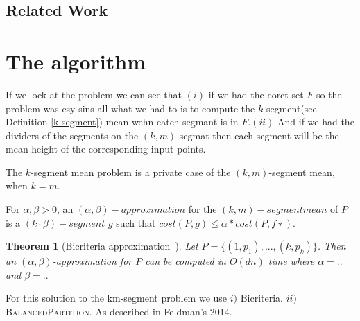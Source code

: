 \documentclass{vldb}
\begin{document}
\subsection{Related Work}

\section{The algorithm}
If we lock at the problem we can see that $(i)$ if we had the corct set $F$
so the problem was esy sins all what we had to is to compute the $k$-segment(see Definition \ref{k-segment}) mean wehn eatch segmant is in $F$.$(ii)$ And if we had the dividers of the segments on the $(k,m)$-segmat then each segment
will be the mean height of the corresponding input points. 

\begin{definition} \label{k-segment}
The $k$-segment mean problem is a private case of the $(k,m)$-segment mean, when $k = m$.

\end{definition}


\begin{definition}
For $ \alpha, \beta > 0$, an $(\alpha, \beta)-approximation$ for the $(k,m)-segment mean$
 of $P$ is a $(k · β)-segment$ $ g$ such that $cost(P, g) \leq \alpha \ast cost(P, f ∗).$

\end{definition}

\newtheorem{theorem}{Theorem}
\begin{theorem}[Bicriteria approximation~\cite{FL11}]
Let $P=\lbrace(1, p_1),...,(k, p_k)\rbrace$. Then an $(\alpha,\beta)$-approximation for $P$ can be computed in $O(dn)$ time where $\alpha=..$ and $\beta=..$

\end{theorem}

For this solution to the km-segment problem we use 
$i)$ Bicriteria.
$ii)$\textsc{ BalancedPartition.}
As described in Feldman's 2014.
\end{document}
